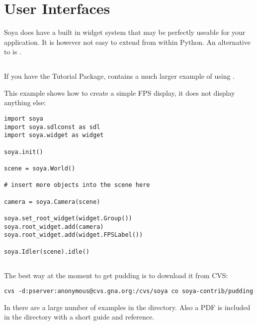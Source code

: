 \section{User Interfaces}

Soya does have a built in widget system that may be perfectly useable 
for your application. It is however not easy to extend from within
Python. An alternative to  is .

\begin{seealso}
\end{seealso}

\subsection{}

If you have the Tutorial Package,  contains a much 
larger example of using .

This example shows how to create a simple FPS display, it does not display
anything else:
\begin{verbatim}
import soya
import soya.sdlconst as sdl
import soya.widget as widget

soya.init()

scene = soya.World()

# insert more objects into the scene here

camera = soya.Camera(scene)

soya.set_root_widget(widget.Group())
soya.root_widget.add(camera)
soya.root_widget.add(widget.FPSLabel())

soya.Idler(scene).idle()
\end{verbatim}


\subsection{}

The best way at the moment to get pudding is to download it from CVS:
\begin{verbatim}
cvs -d:pserver:anonymous@cvs.gna.org:/cvs/soya co soya-contrib/pudding
\end{verbatim}

In  there are a large number of examples in the 
 directory. Also a PDF is included in the  
directory with a short guide and reference. 

